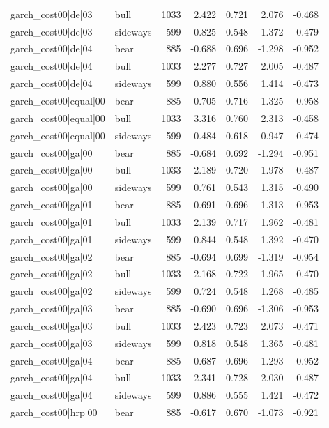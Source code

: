 \begin{table}
\begin{tabular}{llrrrrr}
garch\_cost00|de|03 & bull & 1033 & 2.422 & 0.721 & 2.076 & -0.468 \\
garch\_cost00|de|03 & sideways & 599 & 0.825 & 0.548 & 1.372 & -0.479 \\
garch\_cost00|de|04 & bear & 885 & -0.688 & 0.696 & -1.298 & -0.952 \\
garch\_cost00|de|04 & bull & 1033 & 2.277 & 0.727 & 2.005 & -0.487 \\
garch\_cost00|de|04 & sideways & 599 & 0.880 & 0.556 & 1.414 & -0.473 \\
garch\_cost00|equal|00 & bear & 885 & -0.705 & 0.716 & -1.325 & -0.958 \\
garch\_cost00|equal|00 & bull & 1033 & 3.316 & 0.760 & 2.313 & -0.458 \\
garch\_cost00|equal|00 & sideways & 599 & 0.484 & 0.618 & 0.947 & -0.474 \\
garch\_cost00|ga|00 & bear & 885 & -0.684 & 0.692 & -1.294 & -0.951 \\
garch\_cost00|ga|00 & bull & 1033 & 2.189 & 0.720 & 1.978 & -0.487 \\
garch\_cost00|ga|00 & sideways & 599 & 0.761 & 0.543 & 1.315 & -0.490 \\
garch\_cost00|ga|01 & bear & 885 & -0.691 & 0.696 & -1.313 & -0.953 \\
garch\_cost00|ga|01 & bull & 1033 & 2.139 & 0.717 & 1.962 & -0.481 \\
garch\_cost00|ga|01 & sideways & 599 & 0.844 & 0.548 & 1.392 & -0.470 \\
garch\_cost00|ga|02 & bear & 885 & -0.694 & 0.699 & -1.319 & -0.954 \\
garch\_cost00|ga|02 & bull & 1033 & 2.168 & 0.722 & 1.965 & -0.470 \\
garch\_cost00|ga|02 & sideways & 599 & 0.724 & 0.548 & 1.268 & -0.485 \\
garch\_cost00|ga|03 & bear & 885 & -0.690 & 0.696 & -1.306 & -0.953 \\
garch\_cost00|ga|03 & bull & 1033 & 2.423 & 0.723 & 2.073 & -0.471 \\
garch\_cost00|ga|03 & sideways & 599 & 0.818 & 0.548 & 1.365 & -0.481 \\
garch\_cost00|ga|04 & bear & 885 & -0.687 & 0.696 & -1.293 & -0.952 \\
garch\_cost00|ga|04 & bull & 1033 & 2.341 & 0.728 & 2.030 & -0.487 \\
garch\_cost00|ga|04 & sideways & 599 & 0.886 & 0.555 & 1.421 & -0.472 \\
garch\_cost00|hrp|00 & bear & 885 & -0.617 & 0.670 & -1.073 & -0.921 \\

\end{tabular}
\end{table}
